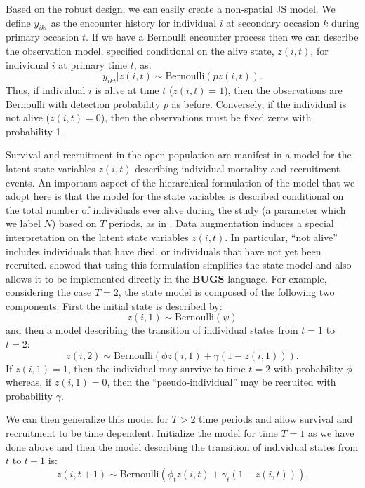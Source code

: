 Based on the robust design, we can easily create a non-spatial JS model.  We define $y_{ikt}$ as the encounter
history for individual $i$ at secondary occasion $k$ during primary occasion $t$.  If we have a Bernoulli encounter
process then we can describe the observation model, specified
conditional on the alive state, $z(i,t)$, for individual $i$ at primary time $t$, as:
 \[
  y_{ikt}|z(i,t) \sim
\mbox{Bernoulli}(p z(i,t)).
\]
Thus, if individual $i$ is alive at time $t$ ($z(i,t)=1$), then the
observations are Bernoulli with detection probability $p$ as before.  Conversely, if the individual is
not alive ($z(i,t)=0$), then the observations must be fixed zeros with
probability 1.

Survival and recruitment in the open population are manifest in a
model for the latent state variables $z(i,t)$ describing individual
mortality and recruitment events.  An important aspect of the
hierarchical formulation of the model that we adopt here is that the
model for the state variables is described conditional on the total
number of individuals ever alive during the study (a parameter which
we label $N$) based on $T$ periods, as in \cite{schwarz_arnason:1996}.  Data
augmentation induces a special interpretation on the latent state
variables $z(i,t)$.
In particular, ``not alive'' includes individuals
that have died, or individuals that have not yet been recruited.
\citep{royle_dorazio:2008} showed that using this formulation 
simplifies the state model and also allows it
to be implemented directly in the \textbf{BUGS} language.
For example, considering the case $T=2$, the state model is composed
of the following two components: First the initial state is described
by:
\[
 z(i,1) \sim \mbox{Bernoulli}(\psi)
\]
and then a model describing the transition of individual states from
$t=1$ to $t=2$:
\[
 z(i,2) \sim \mbox{Bernoulli}( \phi z(i,1)  + \gamma (1-z(i,1)) ).
\]
If $z(i,1)=1$, then the individual may survive to time $t=2$ with
probability $\phi$ whereas, if $z(i,1)=0$, then the
``pseudo-individual'' may be recruited with probability $\gamma$.

We can then generalize this model for $T>2$ time periods and allow survival and
recruitment to be time dependent.  Initialize the
model for time $T=1$ as we have done above
and then the model describing the transition of individual states from
$t$ to $t+1$ is:
\[
 z(i,t+1) \sim \mbox{Bernoulli}( \phi_t z(i,t)  + \gamma_t (1-z(i,t)) ).
\]

